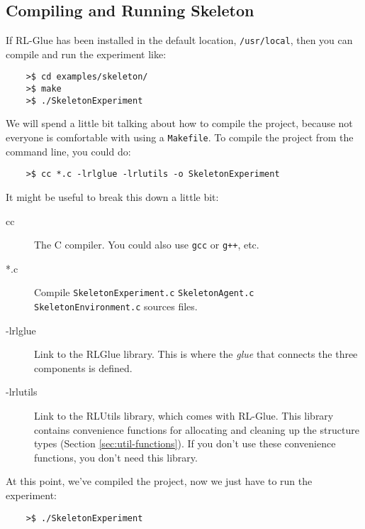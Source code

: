 \documentclass[11pt]{article}
\begin{document}
\subsection{Compiling and Running Skeleton}
If RL-Glue has been installed in the default location, \texttt{/usr/local}, then you can compile and run the experiment like:
\begin{verbatim}
	>$ cd examples/skeleton/
	>$ make
	>$ ./SkeletonExperiment
\end{verbatim}

We will spend a little bit talking about how to compile the project, because not everyone is comfortable with using a \texttt{Makefile}.  To compile
the project from the command line, you could do:
\begin{verbatim}
	>$ cc *.c -lrlglue -lrlutils -o SkeletonExperiment
\end{verbatim}

It might be useful to break this down a little bit:
\begin{description}
\item [cc] The C compiler.  You could also use \texttt{gcc} or \texttt{g++}, etc.
\item [*.c] Compile \texttt{SkeletonExperiment.c} \texttt{SkeletonAgent.c} \texttt{SkeletonEnvironment.c} sources files.
\item [-lrlglue] Link to the RLGlue library.  This is where the \textit{glue} that connects the three components is defined.
\item [-lrlutils] Link to the RLUtils library, which comes with RL-Glue.  This library contains convenience functions for allocating and cleaning up the structure types (Section \ref{sec:util-functions}).  If you 
don't use these convenience functions, you don't need this library.
\end{description}


At this point, we've compiled the project, now we just have to run the experiment:
\begin{verbatim}
	>$ ./SkeletonExperiment
\end{verbatim}
\end{document}
